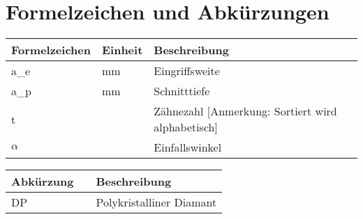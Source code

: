 
\toc %

\chapter{Formelzeichen und Abkürzungen} 
\newcommand{\rowheight}{3ex}
\begin{table}[ht!]
	\begin{tabularx}{\dimexpr\textwidth}{p{3cm} p{3cm} X}
		\textbf{Formelzeichen} & \textbf{Einheit} & \textbf{Beschreibung}   \\ \midrule
		a\_e                   & mm               & Eingriffsweite 			\\[\rowheight]
		a\_p                   & mm               & Schnitttiefe 			\\[\rowheight]
		t            		   &                  & Zähnezahl [Anmerkung: Sortiert wird alphabetisch] \\[\rowheight]
		$\alpha$               &                  & Einfallswinkel \\[\rowheight]
	\end{tabularx}
\end{table}

\begin{table}[ht!]
	\begin{tabularx}{\dimexpr\textwidth}{p{6cm}p{0cm} X}
		\textbf{Abkürzung} && \textbf{Beschreibung}   \\ \midrule
		DP                    && Polykristalliner Diamant \\[\rowheight]
	\end{tabularx}
\end{table}

\loflot %
